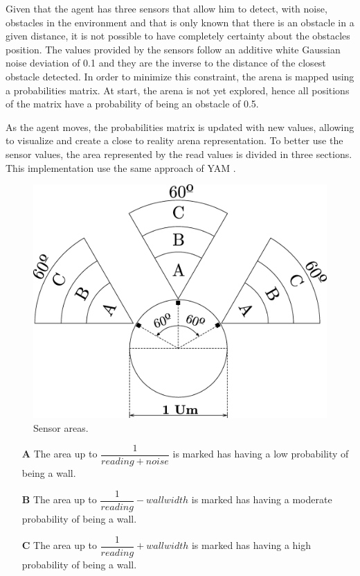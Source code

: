 \documentclass[oribibl]{llncs}
\begin{document}
Given that the agent has three sensors that allow him to detect, with noise, obstacles in the environment and that is only known that there is an obstacle in a given distance, it is not possible to have completely certainty about the obstacles position. The values provided by the sensors follow an additive white Gaussian noise deviation of 0.1 and they are the inverse to the distance of the closest obstacle detected. In order to minimize this constraint, the arena is mapped using a probabilities matrix. At start, the arena is not yet explored, hence all positions of the matrix have a probability of being an obstacle of 0.5.  

As the agent moves, the probabilities matrix is updated with new values, allowing to visualize and create a close to reality arena representation. To better use the sensor values, the area represented by the read values is divided in three sections. This implementation use the same approach of YAM \cite{Ribeiro2002}.

\begin{figure}
  \centering
  \includegraphics[scale=.25]{sensorareas.eps}
  \caption{Sensor areas.}
  \label{fig:sensorareas}
\end{figure}

\begin{itemize}
  \item[\textbf{A}]
  The area up to $\dfrac{1}{reading + noise}$ is marked has having a low probability of being a wall.
  \item[\textbf{B}]
The area up to $\dfrac{1}{reading} - wall width$ is marked has having a moderate probability of being a wall.
  \item[\textbf{C}]
  The area up to $\dfrac{1}{reading} + wall width$ is marked has having a high probability of being a wall.
\end{itemize}
\end{document}
